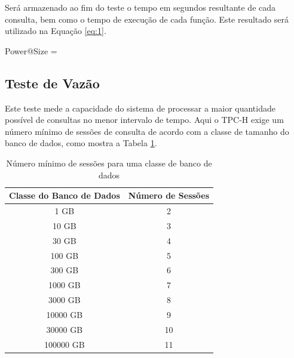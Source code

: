 Será armazenado ao fim do teste o tempo em segundos resultante de cada consulta, bem como o tempo de execução de cada função. Este resultado será utilizado na Equação \ref{eq:1}.

\begin{myequation}%
\label{eq:1}
{\scriptstyle Power@Size} =  %
\end{myequation}
%

\subsection{Teste de Vazão}
\label{through_test}
Este teste mede a capacidade do sistema de processar a maior quantidade possível de consultas no menor intervalo de tempo. Aqui o TPC-H exige um número mínimo de sessões de consulta de acordo com a classe de tamanho do banco de dados, como mostra a Tabela \ref{min_sessions}.

\begin{table}[htpb]
\centering
\caption{Número mínimo de sessões para uma classe de banco de dados}
\label{min_sessions}
\begin{tabular}{|c|c|}
\hline
\multicolumn{1}{|c|}{\textbf{Classe do Banco de Dados}} & \textbf{Número de Sessões} \\ \hline
1 GB                                      & 2                            \\ \hline
10 GB                                      & 3                          \\ \hline
30 GB                                        & 4                             \\ \hline
100 GB                                        & 5                             \\ \hline
300 GB                                        & 6                             \\ \hline
1000 GB                                        & 7                             \\ \hline
3000 GB                                        & 8                             \\ \hline
10000 GB                                        & 9                             \\ \hline
30000 GB                                        & 10                             \\ \hline
100000 GB                                        & 11                             \\ \hline
\end{tabular}
\end{table}

